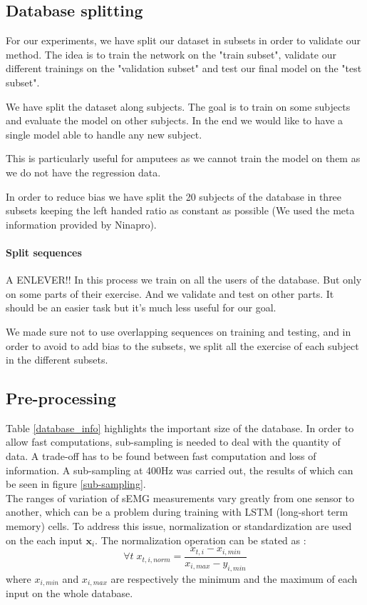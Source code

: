 \documentclass[final]{cvpr}
\begin{document}
\subsection{Database splitting}
For our experiments, we have split our dataset in subsets in order to validate our method. The idea is to train the network on the "train subset", validate our different trainings on the "validation subset" and test our final model on the "test subset".

We have split the dataset along subjects. The goal is to train on some subjects and evaluate the model on other subjects. In the end we would like to have a single model able to handle any new subject.

This is particularly useful for amputees as we cannot train the model on them as we do not have the regression data.

In order to reduce bias we have split the 20 subjects of the database in three subsets keeping the left handed ratio as constant as possible (We used the meta information provided by Ninapro).


\paragraph*{Split sequences}A ENLEVER!! In this process we train on all the users of the database. But only on some parts of their exercise. And we validate and test on other parts. It should be an easier task but it's much less useful for our goal.

We made sure not to use overlapping sequences on training and testing, and in order to avoid to add bias to the subsets, we split all the exercise of each subject in the different subsets.

\subsection{Pre-processing}
Table \ref{database_info} highlights the important size of the database. In order to allow fast computations, sub-sampling is needed to deal with the quantity of data. A trade-off has to be found between fast computation and loss of information. A sub-sampling at 400Hz was carried out, the results of which can be seen in figure \ref{sub-sampling}. \\

The ranges of variation of sEMG measurements vary greatly from one sensor to another, which can be a problem during training with LSTM (long-short term memory) cells. To address this issue, normalization or standardization are used on the each input $\pmb{x}_{i}$.
The normalization operation can be stated as :
$$\forall t \; x_{t,i,norm}=\frac{x_{t,i}-x_{i,min}}{x_{i,max}-y_{i,min}}$$
where $x_{i,min}$ and $x_{i,max}$ are respectively the minimum and the maximum of each input on the whole database.
\end{document}
